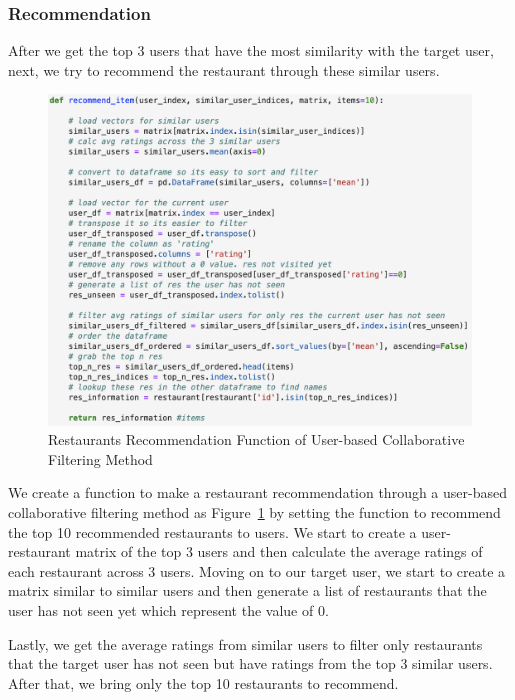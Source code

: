 \documentclass[12pt,oneside,openright,a4paper]{cpe-english-project}
\begin{document}
\subsubsection{Recommendation}

After we get the top 3 users that have the most similarity with the target user, next, we try to recommend the restaurant through these similar users.

\begin{figure}[H]\centering
\includegraphics[width=350pt]{./images/4RestaurantsRecommendationFunctionofUserbasedCollaborativeFilteringMethod.png}
\caption{Restaurants Recommendation Function of User-based Collaborative Filtering Method}\label{fig:4RestaurantsRecommendationFunctionofUserbasedCollaborativeFilteringMethod}
\end{figure}

We create a function to make a restaurant recommendation through a user-based collaborative filtering method as Figure~\ref{fig:4RestaurantsRecommendationFunctionofUserbasedCollaborativeFilteringMethod} by setting the function to recommend the top 10 recommended restaurants to users. We start to create a user-restaurant matrix of the top 3 users and then calculate the average ratings of each restaurant across 3 users. Moving on to our target user, we start to create a matrix similar to similar users and then generate a list of restaurants that the user has not seen yet which represent the value of 0.

Lastly, we get the average ratings from similar users to filter only restaurants that the target user has not seen but have ratings from the top 3 similar users. After that, we bring only the top 10 restaurants to recommend.
\end{document}
